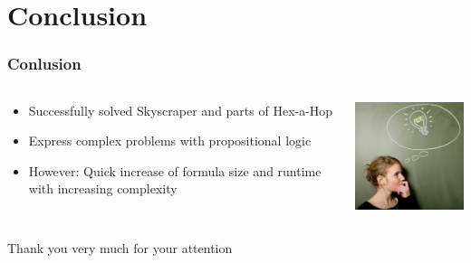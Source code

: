 \section{Conclusion}

\begin{frame}
	\frametitle{Conlusion}
	\begin{columns}
		\begin{column}{6cm}
			\begin{itemize}
				\item Successfully solved Skyscraper and parts of Hex-a-Hop
				\item<2-> Express complex problems with propositional logic
				\item<3-> However: Quick increase of formula size and runtime with increasing complexity
			\end{itemize}
		\end{column}
		\begin{column}{5cm}
			\centering
			\includegraphics[width=4.5cm]{images/bulb.jpg}
		\end{column}
	\end{columns}

\end{frame}

\begin{frame}
	\centering
	\hfill \Large Thank you very much for your attention \hfill\hfill

\end{frame}
